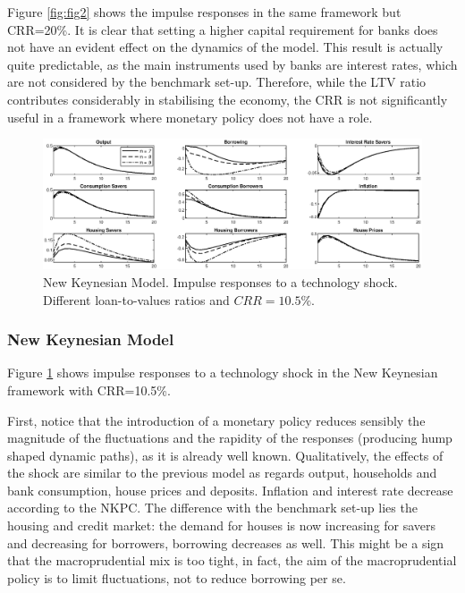 \documentclass[final,3p,times,twocolumn]{elsarticle}
\begin{document}
Figure \ref{fig:fig2} shows the impulse responses in the same framework but CRR=20\%. It is clear that setting a higher capital requirement for banks does not have an evident effect on the dynamics of the model. This result is actually quite predictable, as the main instruments used by banks are interest rates, which are not considered by the benchmark set-up. 
Therefore, while the LTV ratio contributes considerably in stabilising the economy, the CRR is not significantly useful in a framework where monetary policy does not have a role.\par

 
  
\begin{figure}[ht]
\centering
  \includegraphics[width=\linewidth]{fig3_nk_crr_105.eps}
  \caption{New Keynesian Model. Impulse responses to a technology shock. Different loan-to-values ratios and $CRR=10.5\%$.}
    \label{fig:fig3}
\end{figure}


  
   \subsubsection{New Keynesian Model}
 
  Figure \ref{fig:fig3} shows impulse responses to a technology shock in the New Keynesian framework with CRR=10.5\%.
  
First, notice that the introduction of a monetary policy reduces sensibly the magnitude of the fluctuations and the rapidity of the responses (producing hump shaped dynamic paths), as it is already well known. Qualitatively, the effects of the shock are similar to the previous model as regards output, households and bank consumption, house prices and deposits. Inflation and interest rate decrease according to the NKPC.
The difference with the benchmark set-up lies the housing and credit market: the demand for houses is now increasing for savers and decreasing for borrowers, borrowing decreases as well. This might be a sign that the macroprudential mix is too tight, in fact, the aim of the macroprudential policy is to limit fluctuations, not to reduce borrowing per se.\par
\end{document}
